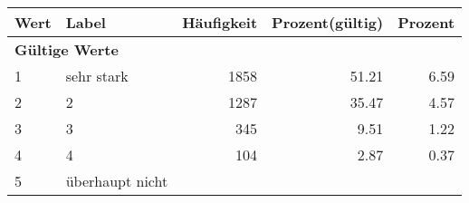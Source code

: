      \begin{longtable}{lXrrr}
     \toprule
     \textbf{Wert} & \textbf{Label} & \textbf{Häufigkeit} & \textbf{Prozent(gültig)} & \textbf{Prozent} \\
     \endhead
     \midrule
     \multicolumn{5}{l}{\textbf{Gültige Werte}}\\

     1 &
     \multicolumn{1}{X}{ sehr stark   } &


       \num{1858} &
       \num[round-mode=places,round-precision=2]{51,21} &
         \num[round-mode=places,round-precision=2]{6,59} \\

     2 &
     \multicolumn{1}{X}{ 2   } &


       \num{1287} &
       \num[round-mode=places,round-precision=2]{35,47} &
         \num[round-mode=places,round-precision=2]{4,57} \\

     3 &
     \multicolumn{1}{X}{ 3   } &


       \num{345} &
       \num[round-mode=places,round-precision=2]{9,51} &
         \num[round-mode=places,round-precision=2]{1,22} \\

     4 &
     \multicolumn{1}{X}{ 4   } &


       \num{104} &
       \num[round-mode=places,round-precision=2]{2,87} &
         \num[round-mode=places,round-precision=2]{0,37} \\

     5 &
     \multicolumn{1}{X}{ überhaupt nicht   } &



\end{longtable}
